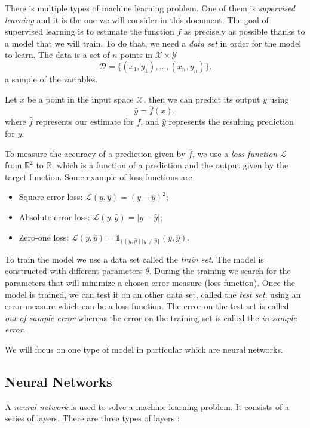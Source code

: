\documentclass[10pt,a4paper]{article}
\theoremstyle{definition}
\theoremstyle{plain}
\begin{document}
There is multiple types of machine learning problem. One of them is \textit{supervised learning} and it is the one we will consider in this document. The goal of supervised learning is to estimate the function $f$ as precisely as possible thanks to a model that we will train. To do that, we need a \textit{data set} in order for the model to learn. The data is a set of $n$ points in $\mathcal{X} \times \mathcal{Y}$ 
$$
\mathcal{D} = \{(x_1, y_1),\dots, (x_n,y_n)\}.
$$
a sample of the variables.

Let $x$ be a point in the input space $\mathcal{X}$, then we can predict its output $y$ using 
$$
\hat{y} = \hat{f}(x),
$$
where $\hat{f}$ represents our estimate for $f$, and $\hat{y}$ represents the resulting prediction for $y$.

To measure the accuracy of a prediction given by $\hat{f}$, we use a \textit{loss function} $\mathcal{L}$ from  $\mathbb{R}^2$ to $\mathbb{R}$, which is a function of a prediction and the output given by the target function. Some example of loss functions are
\begin{itemize}
\item Square error loss: $\mathcal{L}(y, \hat{y}) = (y-\hat{y})^2$;
\item Absolute error loss: $\mathcal{L}(y, \hat{y}) = |y - \hat{y}|$;
\item Zero-one loss: $\mathcal{L}(y, \hat{y}) = \mathds{1}_{\{(y, \hat{y}) | y\neq \hat{y}\}}(y, \hat{y})$.
\end{itemize}

To train the model we use a data set called the \textit{train set}. The model is constructed with different parameters $\theta$. During the training we search for the parameters that will minimize a chosen error measure (loss function). Once the model is trained, we can test it on an other data set, called the \textit{test set}, using an error measure which can be a loss function. The error on the test set is called \textit{out-of-sample error} whereas the error on the training set is called the \textit{in-sample error}.

We will focus on one type of model in particular which are neural networks.

\subsection{Neural Networks}


\noindent A \textit{neural network} \cite{5} is used to solve a machine learning problem. It consists of a series of layers. There are three types of layers :
\end{document}
